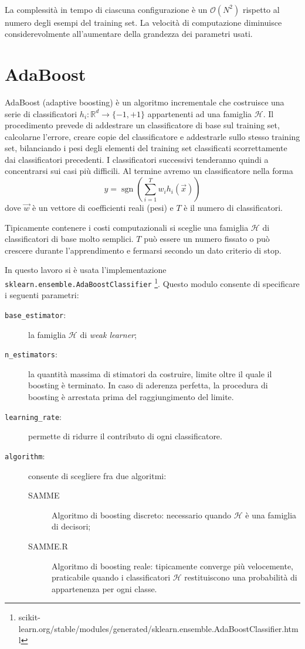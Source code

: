 \documentclass[12pt,a4paper,oneside,hidelinks]{report}
\DeclareMathOperator*{\sgn}{sgn}
\begin{document}
\paragraph*{}
La complessità in tempo di ciascuna configurazione è un $\mathcal{O}(N^2)$ rispetto al numero degli esempi del training set. La velocità di computazione diminuisce considerevolmente all'aumentare della grandezza dei parametri usati.

\section{AdaBoost}
AdaBoost (adaptive boosting) è un algoritmo incrementale che costruisce una serie di classificatori $ h_{i}:\mathbb{R}^{d}\rightarrow \{-1,+1\} $ appartenenti ad una famiglia $ \mathcal{H} $. 
Il procedimento prevede di addestrare un classificatore di base sul training set, calcolarne l'errore, creare copie del classificatore e addestrarle sullo stesso training set, bilanciando i pesi degli elementi del training set classificati scorrettamente dai classificatori precedenti. I classificatori successivi tenderanno quindi a concentrarsi sui casi più difficili.
Al termine avremo un classificatore nella forma
\[\hat{y}=\sgn(\sum_{i=1}^{T} w_{i}h_{i}(\vec{x}))\]
dove $ \vec{w} $ è un vettore di coefficienti reali (pesi) e $ T $ è il numero di classificatori.

Tipicamente contenere i costi computazionali si sceglie una famiglia $ \mathcal{H} $ di classificatori di base molto semplici. $ T $ può essere un numero fissato o può crescere durante l'apprendimento e fermarsi secondo un dato criterio di stop.

In questo lavoro si è usata l'implementazione \texttt{sklearn.ensemble.AdaBoostClassifier}
\footnote{scikit-learn.org/stable/modules/generated/sklearn.ensemble.AdaBoostClassifier.html}.
Questo modulo consente di specificare i seguenti parametri:

\begin{description}
\item[\texttt{base\_estimator}:]la famiglia $ \mathcal{H} $ di \emph{weak learner};
\item[\texttt{n\_estimators}:]la quantità massima di stimatori da costruire, limite oltre il quale il boosting è terminato.
In caso di aderenza perfetta, la procedura di boosting è arrestata prima del raggiungimento del limite.
\item[\texttt{learning\_rate}:] permette di ridurre il contributo di ogni classificatore.
\item[\texttt{algorithm}:]consente di scegliere fra due algoritmi:
\begin{description}
\item[SAMME]Algoritmo di boosting discreto: necessario quando $ \mathcal{H} $ è una famiglia di decisori;
\item[SAMME.R]Algoritmo di boosting reale: tipicamente converge più velocemente, praticabile quando i classificatori $ \mathcal{H} $ restituiscono una probabilità di appartenenza per ogni classe.
\end{description}
\end{description}
 
\end{document}

